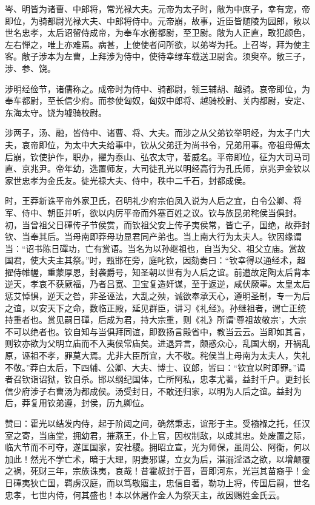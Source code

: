 \documentclass[]{article}
\begin{document}
岑、明皆为诸曹、中郎将，常光禄大夫。元帝为太子时，敞为中庶子，幸有宠，帝即位，为骑都尉光禄大夫、中郎将侍中。元帝崩，故事，近臣皆随陵为园郎，敞以世名忠孝，太后诏留侍成帝，为奉车水衡都尉，至卫尉。敞为人正直，敢犯颜色，左右惮之，唯上亦难焉。病甚，上使使者问所欲，以弟岑为托。上召岑，拜为使主客。敞子涉本为左曹，上拜涉为侍中，使待幸绿车载送卫尉舍。须臾卒。敞三子，涉、参、饶。

涉明经俭节，诸儒称之。成帝时为侍中、骑都尉，领三辅胡、越骑。哀帝即位，为奉车都尉，至长信少府。而参使匈奴，匈奴中郎将、越骑校尉、关内都尉，安定、东海太守。饶为墟骑校尉。

涉两子，汤、融，皆侍中、诸曹、将、大夫。而涉之从父弟钦举明经，为太子门大夫，哀帝即位，为太中大夫给事中，钦从父弟迁为尚书令，兄弟用事。帝祖母傅太后崩，钦使护作，职办，擢为泰山、弘农太守，著威名。平帝即位，征为大司马司直、京兆尹。帝年幼，选置师友，大司徒孔光以明经高行为孔氏师，京兆尹金钦以家世忠孝为金氏友。徙光禄大夫、侍中，秩中二千石，封都成侯。

时，王莽新诛平帝外家卫氏，召明礼少府宗伯凤入说为人后之宜，白令公卿、将军、侍中、朝臣并听，欲以内厉平帝而外塞百姓之议。钦与族昆弟秺侯当俱封。初，当曾祖父日磾传子节侯赏，而钦祖父安上传子夷侯常，皆亡子，国绝，故莽封钦、当奉其后。当母南即莽母功显君同产弟也。当上南大行为太夫人。钦因缘谓当：``诏书陈日磾功，亡有赏语。当名为以孙继祖也，自当为父、祖父立庙。赏故国君，使大夫主其祭。''时，甄邯在旁，庭叱钦，因劾奏曰：``钦幸得以通经术，超擢侍帷幄，重蒙厚恩，封袭爵号，知圣朝以世有为人后之谊。前遭故定陶太后背本逆天，孝哀不获厥福，乃者吕宽、卫宝复造奸谋，至于返逆，咸伏厥辜。太皇太后惩艾悼惧，逆天之咎，非圣诬法，大乱之殃，诚欲奉承天心，遵明圣制，专一为后之谊，以安天下之命，数临正殿，延见群臣，讲习《礼经》。孙继祖者，谓亡正统持重者也。赏见嗣日磾，后成为君，持大宗重，则《礼》所谓`尊祖故敬宗'，大宗不可以绝者也。钦自知与当俱拜同谊，即数扬言殿省中，教当云云。当即如其言，则钦亦欲为父明立庙而不入夷侯常庙矣。进退异言，颇惑众心，乱国大纲，开祸乱原，诬祖不孝，罪莫大焉。尤非大臣所宜，大不敬。秺侯当上母南为太夫人，失礼不敬。''莽白太后，下四辅、公卿、大夫、博士、议郎，皆曰：``钦宜以时即罪。''谒者召钦诣诏狱，钦自杀。邯以纲纪国体，亡所阿私，忠孝尤著，益封千户。更封长信少府涉子右曹汤为都成侯。汤受封日，不敢还归家，以明为人后之谊。益封为后，莽复用钦弟遵，封侯，历九卿位。

赞曰：霍光以结发内侍，起于阶闼之间，确然秉志，谊形于主。受襁褓之托，任汉室之寄，当庙堂，拥幼君，摧燕王，仆上官，因权制敌，以成其忠。处废置之际，临大节而不可夺，遂匡国家，安社稷。拥昭立宣，光为师保，虽周公、阿衡，何以加此！然光不学亡术，暗于大理，阴妻邪谋，立女为后，湛溺淫溢之欲，以增颠覆之祸，死财三年，宗族诛夷，哀哉！昔霍叔封于晋，晋即河东，光岂其苗裔乎！金日磾夷狄亡国，羁虏汉庭，而以笃敬寤主，忠信自著，勒功上将，传国后嗣，世名忠孝，七世内侍，何其盛也！本以休屠作金人为祭天主，故因赐姓金氏云。
\end{document}
